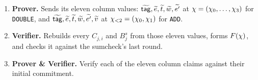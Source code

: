 \begin{enumerate}[itemsep=1pt,topsep=3pt]
They run over different cubes, $\cube{4}$ for \texttt{DOUBLE} and $\cube{2}$ for \texttt{ADD}, so \texttt{ADD}'s part is multiplied by $X_2X_3$, the two variables it does not use, whose sum over $\cube{2}$ is $1$ and so leaves its own sum untouched:
\begin{align*}
  F(X_0,\dots,X_3)&=\eq\bigl(\zeta_{<4},(X_0,\dots,X_3)\bigr)\Bigl(\xi^{0}B^{\push}_{1}+\xi^{1}B^{\pull}_{1}+\xi^{2}C_{1,1}+\xi^{3}C_{1,2}\Bigr)\\
                  &\quad+\eq\bigl(\zeta_{<2},(X_0,X_1)\bigr)\Bigl(\xi^{0}B^{\push}_{2}+\xi^{1}B^{\pull}_{2}+\xi^{4}C_{2,1}+\xi^{5}C_{2,2}+\xi^{6}C_{2,3}\Bigr)X_2X_3 .
\end{align*}
One sumcheck over $\cube{4}$ then proves all seven claims at once:
\[
  \sum_{x\in\cube{4}}F(x)\qeq\xi^{0}\mathsf{rem}_{\push}+\xi^{1}\mathsf{rem}_{\pull}.
\]
\item \textbf{Prover.} Sends its eleven column values: $\widetilde{\mathsf{tag}},\widetilde{e},\widetilde{t},\widetilde{w},\widetilde{e'}$ at $\chi=(\chi_0,\dots,\chi_3)$ for \texttt{DOUBLE}, and $\widetilde{\mathsf{tag}},\widetilde{e},\widetilde{t},\widetilde{w},\widetilde{e'},\widetilde{v}$ at $\chi_{<2}=(\chi_0,\chi_1)$ for \texttt{ADD}.
\item \textbf{Verifier.} Rebuilds every $C_{j,i}$ and $B^{s}_{j}$ from those eleven values, forms $F(\chi)$, and checks it against the sumcheck's last round.
\item \textbf{Prover \& Verifier.} Verify each of the eleven column claims against their initial commitment.
\end{enumerate}
